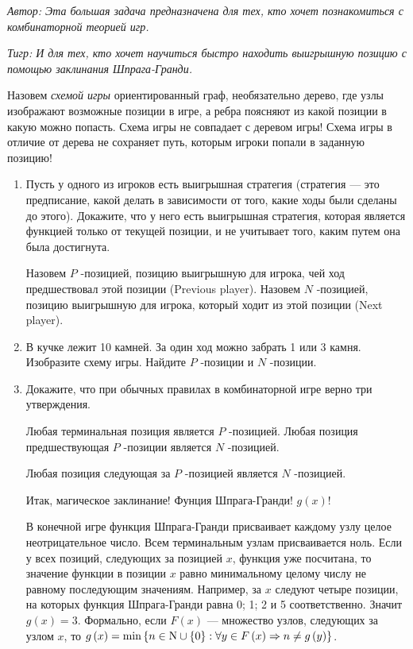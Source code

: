 \begin{problem}

{\it Автор: Эта большая задача предназначена для тех, кто хочет познакомиться с комбинаторной теорией игр. }\par
{\it Тигр: И для тех, кто хочет научиться быстро находить выигрышную позицию с помощью заклинания Шпрага-Гранди.}\par
Назовем {\it схемой игры} ориентированный граф, необязательно дерево, где узлы изображают возможные позиции в игре, а ребра поясняют из какой позиции в какую можно попасть. Схема игры не совпадает с деревом игры! Схема игры в отличие от дерева не сохраняет путь, которым игроки попали в заданную позицию!
\begin{enumerate}
\item 	Пусть у одного из игроков есть выигрышная стратегия (стратегия --- это предписание, какой делать в зависимости от того, какие ходы были сделаны до этого). Докажите, что у него есть выигрышная стратегия, которая является функцией только от текущей позиции, и не учитывает того, каким путем она была достигнута. \par
Назовем  $P$ -позицией, позицию выигрышную для игрока, чей ход предшествовал этой позиции (Previous player). Назовем  $N$ -позицией, позицию выигрышную для игрока, который ходит из этой позиции (Next player).\par
\item	В кучке лежит 10 камней. За один ход можно забрать 1 или 3 камня. Изобразите схему игры. Найдите  $P$ -позиции и  $N$ -позиции.\par
\item 	Докажите, что при обычных правилах в комбинаторной игре верно три утверждения. \par
Любая терминальная позиция является  $P$ -позицией.
Любая позиция предшествующая  $P$ -позиции является  $N$ -позицией. \par
Любая позиция следующая за  $P$ -позицией является  $N$ -позицией.\par
Итак, магическое заклинание! Фунция Шпрага-Гранди!  $g\left(x\right)$!\par
В конечной игре функция Шпрага-Гранди присваивает каждому узлу целое неотрицательное число.
Всем терминальным узлам присваивается ноль.
Если у всех позиций, следующих за позицией  $x$, функция уже посчитана, то значение функции в позиции  $x$  равно минимальному целому числу не равному последующим значениям.
Например, за  $x$  следуют четыре позиции, на которых функция Шпрага-Гранди равна 0; 1; 2 и 5 соответственно. Значит  $g\left(x\right)=3$. Формально, если  $F\left(x\right)$  --- множество узлов, следующих за узлом  $x$, то  $g\left(x\right)=\min \left\{n\in {\rm N} \cup \left\{0\right\}:\forall y\in F\left(x\right)\Rightarrow n\ne g\left(y\right)\right\}$.

\end{enumerate}
\end{problem}

